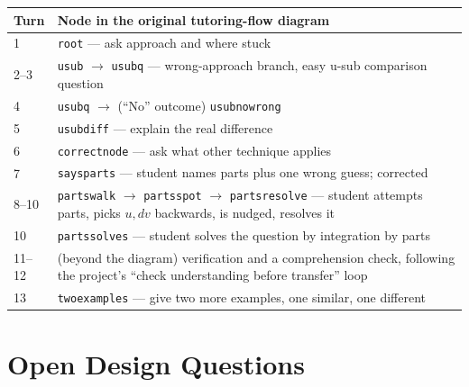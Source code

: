 \documentclass[11pt]{article}
\begin{document}
\begin{center}
\begin{tabularx}{\linewidth}{P{1.2cm} X}
\toprule
\textbf{Turn} & \textbf{Node in the original tutoring-flow diagram} \\
 & \texttt{root} --- ask approach and where stuck \\
2--3 & \texttt{usub} $\to$ \texttt{usubq} --- wrong-approach branch, easy u-sub comparison question \\
4 & \texttt{usubq} $\to$ (``No'' outcome) \texttt{usubnowrong} \\
5 & \texttt{usubdiff} --- explain the real difference \\
6 & \texttt{correctnode} --- ask what other technique applies \\
7 & \texttt{saysparts} --- student names parts plus one wrong guess; corrected \\
8--10 & \texttt{partswalk} $\to$ \texttt{partsspot} $\to$ \texttt{partsresolve} --- student attempts parts, picks $u,dv$ backwards, is nudged, resolves it \\
10 & \texttt{partssolves} --- student solves the question by integration by parts \\
11--12 & (beyond the diagram) verification and a comprehension check, following the project's ``check understanding before transfer'' loop \\
13 & \texttt{twoexamples} --- give two more examples, one similar, one different \\
\bottomrule
\end{tabularx}
\end{center}

\section{Open Design Questions}
\end{document}
